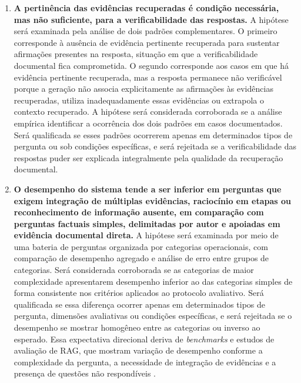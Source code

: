 \begin{enumerate}[label=\textbf{H\arabic*.}]
  \item \textbf{A pertinência das evidências recuperadas é condição necessária, mas não suficiente, para a verificabilidade das respostas.} A hipótese será examinada pela análise de dois padrões complementares. O primeiro corresponde à ausência de evidência pertinente recuperada para sustentar afirmações presentes na resposta, situação em que a verificabilidade documental fica comprometida. O segundo corresponde aos casos em que há evidência pertinente recuperada, mas a resposta permanece não verificável porque a geração não associa explicitamente as afirmações às evidências recuperadas, utiliza inadequadamente essas evidências ou extrapola o contexto recuperado. A hipótese será considerada corroborada se a análise empírica identificar a ocorrência dos dois padrões em casos documentados. Será qualificada se esses padrões ocorrerem apenas em determinados tipos de pergunta ou sob condições específicas, e será rejeitada se a verificabilidade das respostas puder ser explicada integralmente pela qualidade da recuperação documental.
  \item \textbf{O desempenho do sistema tende a ser inferior em perguntas que exigem integração de múltiplas evidências, raciocínio em etapas ou reconhecimento de informação ausente, em comparação com perguntas factuais simples, delimitadas por autor e apoiadas em evidência documental direta.} A hipótese será examinada por meio de uma bateria de perguntas organizada por categorias operacionais, com comparação de desempenho agregado e análise de erro entre grupos de categorias. Será considerada corroborada se as categorias de maior complexidade apresentarem desempenho inferior ao das categorias simples de forma consistente nos critérios aplicados ao protocolo avaliativo. Será qualificada se essa diferença ocorrer apenas em determinados tipos de pergunta, dimensões avaliativas ou condições específicas, e será rejeitada se o desempenho se mostrar homogêneo entre as categorias ou inverso ao esperado. Essa expectativa direcional deriva de \textit{benchmarks} e estudos de avaliação de RAG, que mostram variação de desempenho conforme a complexidade da pergunta, a necessidade de integração de evidências e a presença de questões não respondíveis \parencite{saadFalconEtAl2024ares,esEtAl2023ragas,zhuEtAl2025rageval,pipitoneAlami2024legalbenchRag}.

\end{enumerate}
